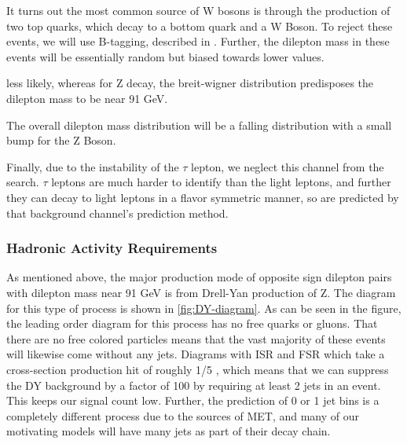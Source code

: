       It turns out the most common source of W bosons is through the production of two top quarks, which decay to a bottom quark and a W Boson. To reject these events, we will use B-tagging, described in . Further, the dilepton mass in these events will be essentially random  but biased towards lower values. 

      less likely, whereas for Z decay, the breit-wigner distribution predisposes the dilepton mass to be near 91 GeV. 

      The overall dilepton mass distribution will be a falling distribution with a small bump for the Z Boson. 


      Finally, due to the instability of the $\tau$ lepton, we neglect this channel from the search. $\tau$ leptons are much harder to identify than the light leptons, and further they can decay to light leptons in a flavor symmetric manner, so are predicted by that background channel's prediction method.

    \subsubsection{Hadronic Activity Requirements}
      As mentioned above, the major production mode of opposite sign dilepton pairs with dilepton mass near 91 GeV is from Drell-Yan production of Z. The diagram for this type of process is shown in \ref{fig:DY-diagram}. As can be seen in the figure, the leading order diagram for this process has no free quarks or gluons. That there are no free colored particles means that the vast majority of these events will likewise come without any jets. Diagrams with ISR and FSR which take a cross-section production hit of roughly 1/5 , which means that we can suppress the DY background by a factor of 100 by requiring at least 2 jets in an event. This keeps our signal count low. Further, the prediction of 0 or 1 jet bins is a completely different process due to the sources of MET, and many of our motivating models will have many jets as part of their decay chain. 

